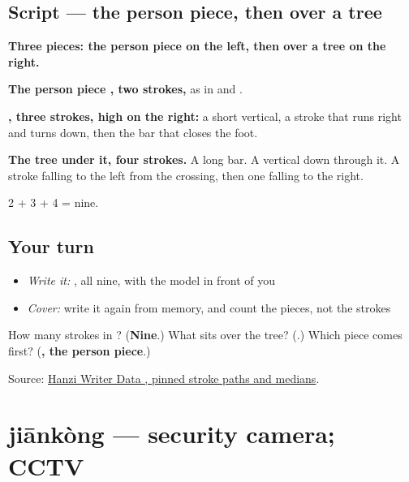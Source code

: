 \subsection*{Script — the person piece, then  over a tree}

\begin{quote}
\end{quote}

\textbf{Three pieces: the person piece on the left, then  over a tree on the right.}

\textbf{The person piece , two strokes,} as in  and .

\textbf{, three strokes, high on the right:} a short vertical, a stroke that runs right and turns down, then the bar that closes the foot.

\textbf{The tree under it, four strokes.} A long bar. A vertical down through it. A stroke falling to the left from the crossing, then one falling to the right.

2 + 3 + 4 = nine.

\subsection*{Your turn}
\begin{itemize}
\raggedright
  \item \emph{Write it:} , all nine, with the model in front of you
  \item \emph{Cover:} write it again from memory, and count the pieces, not the strokes
\end{itemize}

\begin{tcolorbox}[breakable,colback=teal!4,colframe=teal!35!black,title={Before you move on}]
How many strokes in ? (\textbf{Nine}.) What sits over the tree? (\textbf{}.) Which piece comes first? (\textbf{, the person piece}.)

Source: \href{https://raw.githubusercontent.com/chanind/hanzi-writer-data/68d10a4b21150cae5e1ebbd223eed289cf32d90c/data/\%E4\%BF\%9D.json}{Hanzi Writer Data , pinned stroke paths and medians}.
\end{tcolorbox}
\section[jiānkòng]{jiānkòng — security camera; CCTV}

